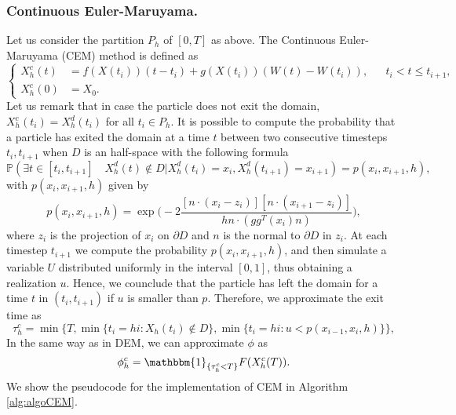 \subsubsection{Continuous Euler-Maruyama. }
Let us consider the partition $P_h$ of $[0,T]$ as above. The Continuous Euler-Maruyama (CEM) method is defined as
\begin{equation}\label{eq:CEM}
	\left \{
	\begin{aligned}
		X_h^c(t) &= f(X(t_i))(t-t_i) + g(X(t_i))(W(t) - W(t_{i})),  && t_i < t \leq t_{i+1},\\
		X_h^c(0) &= X_0.
	\end{aligned} \right .
\end{equation} 
Let us remark that in case the particle does not exit the domain, $X_h^c(t_i) = X_h^d(t_i)$ for all $t_i \in P_h$. It is possible to compute the probability that a particle has exited the domain at a time $t$ between two consecutive timesteps $t_i,t_{i+1}$ when $D$ is an half-space with the following formula \cite{Gobet2001}
\begin{equation}\label{eq:CEMProb}
	\mathbb{P} (\exists t \in [ t_i,t_{i+1} ] \quad X_h^d(t) \notin D | X_h^d(t_i) = x_i, X_h^d(t_{i+1}) = x_{i+1}) = p(x_i,x_{i+1},h),
\end{equation}
with $p(x_i,x_{i+1},h)$ given by
\begin{equation}\label{eq:CEMProbHalfSpace}
	p(x_i,x_{i+1},h) = \exp\Big(-2\frac{[n\cdot(x_i - z_i)][n\cdot(x_{i+1} - z_i)]}{hn\cdot (gg^T(x_i)n)}\Big),
\end{equation}
where $z_i$ is the projection of $x_i$ on $\partial D$ and $n$ is the normal to $\partial D$ in $z_i$. At each timestep $t_{i+1}$ we compute the probability $p(x_i,x_{i+1},h)$, and then simulate a variable $U$ distributed uniformly in the interval $\left[0,1\right]$, thus obtaining a realization $u$. Hence, we counclude that the particle has left the domain for a time $t$ in $(t_i,t_{i+1})$ if $u$ is smaller than $p$. Therefore, we approximate the exit time as
\begin{equation}\label{eq:TauCEM}
	\tau_h^c = \min \{T,\min\{t_i = hi \colon X_h(t_i) \notin D\}, \min\{t_i = hi \colon u < p(x_{i-1},x_i,h) \}\},
\end{equation}
In the same way as in DEM, we can approximate $\phi$ as
\begin{equation}\label{eq:PhiCEM}
	\phi_h^c = \mathbbm{1}_{\{\tau_h^c < T\}}F(X_h^c(T)).
\end{equation}
We show the pseudocode for the implementation of CEM in Algorithm \ref{alg:algoCEM}.

